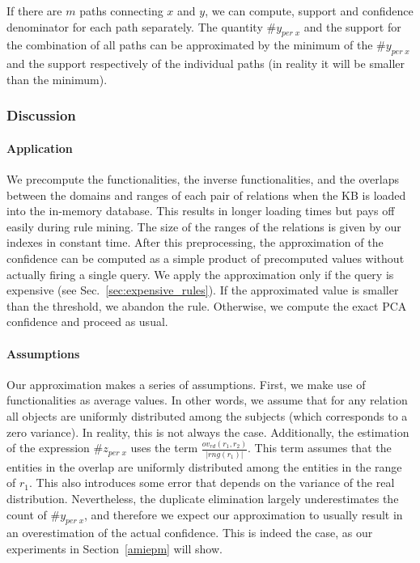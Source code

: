 {If there are $m$ paths connecting $x$ and $y$, we can compute, support and confidence denominator for each path separately.
The quantity $\#y_{per\;x}$ and the support for the combination of all paths can be approximated by the minimum of the $\#y_{per\;x}$ and the support 
respectively of the individual paths (in reality it will be smaller than the minimum). 
}

\subsubsection{Discussion}

\paragraph{Application} We precompute the functionalities,
the inverse functionalities, and the overlaps between the domains and ranges of each pair of relations when the KB is loaded
into the in-memory database. This results in longer loading times but pays off easily during rule mining. The size of the ranges of the relations is given by
our indexes in constant time.
After this preprocessing, the approximation of the confidence can be computed as a simple product of precomputed values without actually firing a single query.
We apply the approximation only if the query is expensive (see Sec.~\ref{sec:expensive_rules}).
If the approximated value is smaller than the threshold, we abandon the rule.
Otherwise, we compute the exact PCA confidence and proceed as usual.

\paragraph{Assumptions} Our approximation makes a series of assumptions.
First, we make use of functionalities as average values. In other words, we assume that for any relation all objects are uniformly distributed among the subjects (which corresponds to a zero variance).
In reality, this is not always the case. Additionally,
the estimation of the expression $\#z_{per \; x}$ uses the term $\frac{ov_{rd}(r_1,r_2)}{|rng(r_1)|}$.
This term assumes that the entities in the overlap are uniformly distributed among the entities in the range of $r_1$. 
This also introduces some error that depends on the variance of the real distribution.
Nevertheless, the duplicate elimination largely underestimates the count of $\#y_{per\;x}$, and therefore we expect our approximation to usually
result in an overestimation of the actual confidence. This is indeed the case, as our experiments in Section~\ref{amiepm} will show.



